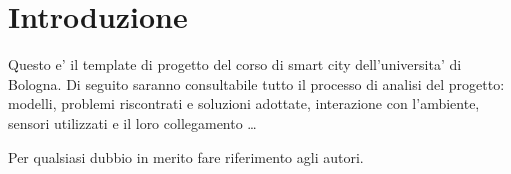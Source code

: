 \section{Introduzione}

Questo e' il template di progetto del corso di smart city dell'universita' di Bologna. Di seguito saranno consultabile tutto il processo di analisi del progetto: modelli, problemi riscontrati e soluzioni adottate, interazione con l'ambiente, sensori utilizzati e il loro collegamento \ldots

Per qualsiasi dubbio in merito fare riferimento agli autori.
